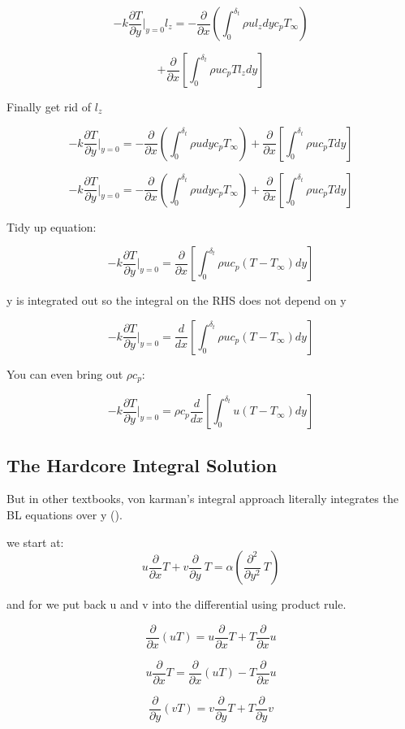 \documentclass[11pt]{article}
\begin{document}
$$- k \frac{\partial T}{\partial y} |_{y=0} l_z   = - \frac{\partial}{\partial x} (\int_0^{\delta_t} \rho u l_z dy  c_p T_\infty ) $$

$$+ \frac{\partial}{\partial x} [ \int_0^{\delta_t} \rho u c_p T l_z dy ]$$

Finally get rid of $l_z$

$$- k \frac{\partial T}{\partial y} |_{y=0}    = - \frac{\partial}{\partial x} (\int_0^{\delta_t} \rho u  dy  c_p T_\infty ) + \frac{\partial}{\partial x} [ \int_0^{\delta_t} \rho u c_p T  dy ]$$

$$- k \frac{\partial T}{\partial y} |_{y=0}    = - \frac{\partial}{\partial x} (\int_0^{\delta_t} \rho u  dy  c_p T_\infty ) + \frac{\partial}{\partial x} [ \int_0^{\delta_t} \rho u c_p T  dy ]$$


Tidy up equation:

$$- k \frac{\partial T}{\partial y} |_{y=0}    = \frac{\partial}{\partial x} [ \int_0^{\delta_t} \rho u c_p ( T -  T_\infty)  dy ]$$

y is integrated out so the integral on the RHS does not depend on y

$$- k \frac{\partial T}{\partial y} |_{y=0}    = \frac{d}{d x} [ \int_0^{\delta_t} \rho u c_p ( T -  T_\infty)  dy ]$$

You can even bring out $\rho c_p$:

$$- k \frac{\partial T}{\partial y} |_{y=0}    = \rho c_p \frac{d}{d x} [ \int_0^{\delta_t}  u  ( T -  T_\infty)  dy ]$$

\subsection{The Hardcore Integral Solution}
But in other textbooks, von karman's integral approach literally integrates the BL equations over y (\cite{bejan2013convection}). 


we start at:
$$ u \frac{\partial}{\partial x} T + v \frac{\partial }{\partial y} \ T  = \alpha (\frac{\partial^2 }{\partial y^2} \ T ) $$ 

and for we put back u and v into the differential using product rule. 

$$\frac{\partial}{\partial x}(uT) = u \frac{\partial}{\partial x}T + T \frac{\partial}{\partial x}u$$

$$u \frac{\partial}{\partial x}T =\frac{\partial}{\partial x}(uT)  - T \frac{\partial}{\partial x}u $$

$$\frac{\partial}{\partial y}(vT) = v \frac{\partial}{\partial y}T + T \frac{\partial}{\partial y}v$$
\end{document}
